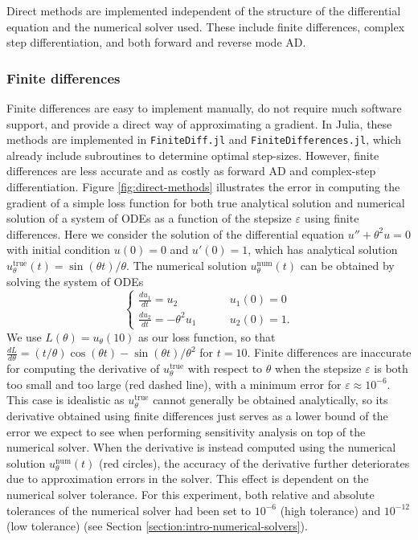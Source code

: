 Direct methods are implemented independent of the structure of the differential equation and the numerical solver used. 
These include finite differences, complex step differentiation, and both forward and reverse mode AD. 

\subsubsection{Finite differences}
\label{section:software-finite-differences}

Finite differences are easy to implement manually, do not require much software support, and provide a direct way of approximating a gradient. 
In Julia, these methods are implemented in \texttt{FiniteDiff.jl} and \texttt{FiniteDifferences.jl}, which already include subroutines to determine optimal step-sizes.
However, finite differences are less accurate and as costly as forward AD \cite{Griewank_1989} and complex-step differentiation. 
Figure \ref{fig:direct-methods} illustrates the error in computing the gradient of a simple loss function for both true analytical solution and numerical solution of a system of ODEs as a function of the stepsize $\varepsilon$ using finite differences.
Here we consider the solution of the differential equation $u'' + \theta^2 u = 0$ with initial condition $u(0)=0$ and $u'(0)=1$, which has analytical solution $u^\text{true}_\theta(t) = \sin(\theta t) / \theta$.
The numerical solution $u_\theta^\text{num}(t)$ can be obtained by solving the system of ODEs
\begin{equation}
\begin{cases}
    \frac{du_1}{dt} = u_2 \,   & \qquad u_1(0) = 0 \\
    \frac{du_2}{dt} = - \theta^2 u_1 \,   & \qquad u_2(0) = 1.
    \label{eq:example-ode-direct-methods}
\end{cases}
\end{equation}
We use $L(\theta) = u_\theta(10)$ as our loss function, so that $\frac{dL}{d\theta} = (t / \theta) \cos(\theta t)  - \sin (\theta t) / \theta^2$ for $t=10$.
Finite differences are inaccurate for computing the derivative of $u_\theta^\text{true}$ with respect to $\theta$ when the stepsize $\varepsilon$ is both too small and too large (red dashed line), with a minimum error for $\varepsilon \approx 10^{-6}$.
This case is idealistic as $u_\theta^\text{true}$ cannot generally be obtained analytically, so its derivative obtained using finite differences just serves as a lower bound of the error we expect to see when performing sensitivity analysis on top of the numerical solver. 
When the derivative is instead computed using the numerical solution $u_\theta^\text{num}(t)$ (red circles), the accuracy of the derivative further deteriorates due to approximation errors in the solver. 
This effect is dependent on the numerical solver tolerance. 
For this experiment, both relative and absolute tolerances of the numerical solver had been set to $10^{-6}$ (high tolerance) and $10^{-12}$ (low tolerance) (see Section \ref{section:intro-numerical-solvers}).

